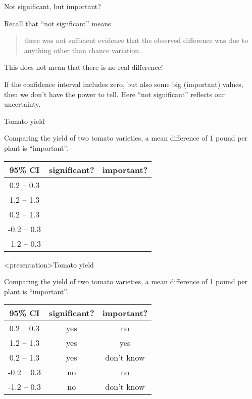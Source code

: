 \begin{frame}{Not significant, but important?}

    Recall that ``not signficant'' means
    \begin{quote}
        there was not sufficient evidence that the observed difference was due to anything other than chance variation.
    \end{quote}


    \vspace{2em}

    This does \alert{not} mean that there is no real difference!

    \vspace{2em}

    If the confidence interval includes zero, but also some big (important) values,
    then we don't have the \alert{power} to tell.  
    Here ``not significant'' reflects our uncertainty.



\end{frame}


\begin{frame}{Tomato yield}

    Comparing the yield of two tomato varieties,
    a mean difference of 1 pound per plant is ``important''.

    \begin{tabular}{c|cc}
        95\% CI & significant? & important? \\
        \hline
        0.2 -- 0.3 & & \\
        1.2 -- 1.3 & & \\
        0.2 -- 1.3 & & \\
        -0.2 -- 0.3 & & \\
        -1.2 -- 0.3 & & \\
        \hline
    \end{tabular}


\end{frame}


\begin{frame}<presentation>{Tomato yield}

    Comparing the yield of two tomato varieties,
    a mean difference of 1 pound per plant is ``important''.

    \begin{tabular}{c|cc}
        95\% CI & significant? & important? \\
        \hline
        0.2 -- 0.3 & yes & no \\
        1.2 -- 1.3 & yes & yes \\
        0.2 -- 1.3 & yes & don't know \\
        -0.2 -- 0.3 & no & no \\
        -1.2 -- 0.3 & no & don't know \\
        \hline
    \end{tabular}


\end{frame}






